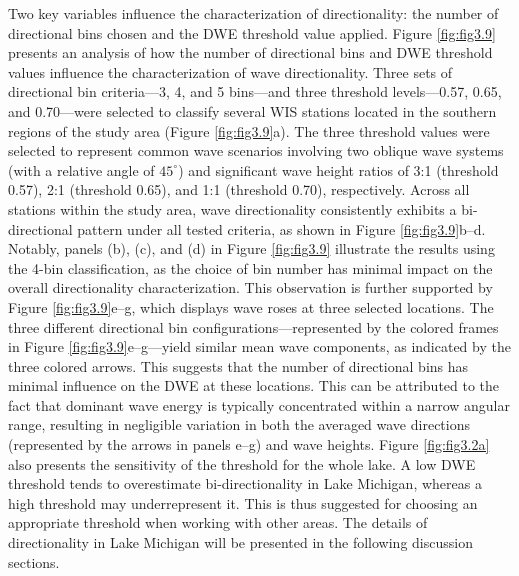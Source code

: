Two key variables influence the characterization of directionality: the number
of directional bins chosen and the DWE threshold value applied. Figure
\ref{fig:fig3.9} presents an analysis of how the number of directional bins and
DWE threshold values influence the characterization of wave directionality.
Three sets of directional bin criteria—3, 4, and 5 bins—and three threshold
levels—0.57, 0.65, and 0.70—were selected to classify several WIS stations
located in the southern regions of the study area (Figure \ref{fig:fig3.9}a).
The three threshold values were selected to represent common wave scenarios
involving two oblique wave systems (with a relative angle of $45^\circ$) and
significant wave height ratios of 3:1 (threshold 0.57), 2:1 (threshold 0.65),
and 1:1 (threshold 0.70), respectively. Across all stations within the study
area, wave directionality consistently exhibits a bi-directional pattern under
all tested criteria, as shown in Figure \ref{fig:fig3.9}b–d. Notably, panels
(b), (c), and (d) in Figure \ref{fig:fig3.9} illustrate the results using the
4-bin classification, as the choice of bin number has minimal impact on the
overall directionality characterization. This observation is further supported
by Figure \ref{fig:fig3.9}e–g, which displays wave roses at three selected
locations. The three different directional bin configurations—represented by the
colored frames in Figure \ref{fig:fig3.9}e–g—yield similar mean wave
components, as indicated by the three colored arrows. This suggests that the
number of directional bins has minimal influence on the DWE at these locations.
This can be attributed to the fact that dominant wave energy is typically
concentrated within a narrow angular range, resulting in negligible variation in
both the averaged wave directions (represented by the arrows in panels e–g) and
wave heights. Figure \ref{fig:fig3.2a} also presents the sensitivity of the
threshold for the whole lake. A low DWE threshold tends to overestimate
bi-directionality in Lake Michigan, whereas a high threshold may underrepresent
it. This is thus suggested for choosing an appropriate threshold when working
with other areas. The details of directionality in Lake Michigan will be
presented in the following discussion sections.

